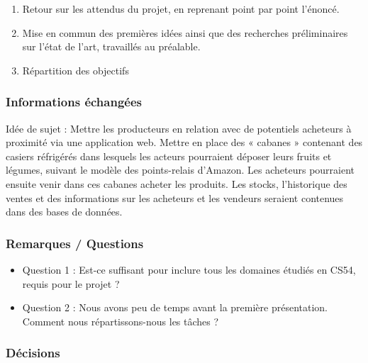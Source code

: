\documentclass[11pt]{article}
\begin{document}
\begin{enumerate}

	\item 
	Retour sur les attendus du projet, en reprenant point par point l’énoncé.
\item 	Mise en commun des premières idées ainsi que des recherches préliminaires sur l’état de l’art, travaillés au préalable.
\item 	Répartition des objectifs

\end{enumerate}

\vspace{0.5cm}

\subsubsection{Informations échangées}
\vspace{0.2cm}

	Idée de sujet : Mettre les producteurs en relation avec de potentiels acheteurs à proximité via une application web. Mettre en place des « cabanes » contenant des casiers réfrigérés dans lesquels les acteurs pourraient déposer leurs fruits et légumes, suivant le modèle des points-relais d’Amazon. Les acheteurs pourraient ensuite venir dans ces cabanes acheter les produits. Les stocks, l’historique des ventes et des informations sur les acheteurs et les vendeurs seraient contenues dans des bases de données.

\vspace{0.5cm}

\subsubsection{Remarques / Questions}
\vspace{0.2cm}

\begin{itemize}
	\item Question 1 : Est-ce suffisant pour inclure tous les domaines étudiés en CS54, requis pour le projet ?
	\item Question 2 : Nous avons peu de temps avant la première présentation. Comment nous répartissons-nous les tâches ?

\end{itemize}

\vspace{0.5cm}
\subsubsection{Décisions} 
\vspace{0.2cm}
\end{document}
